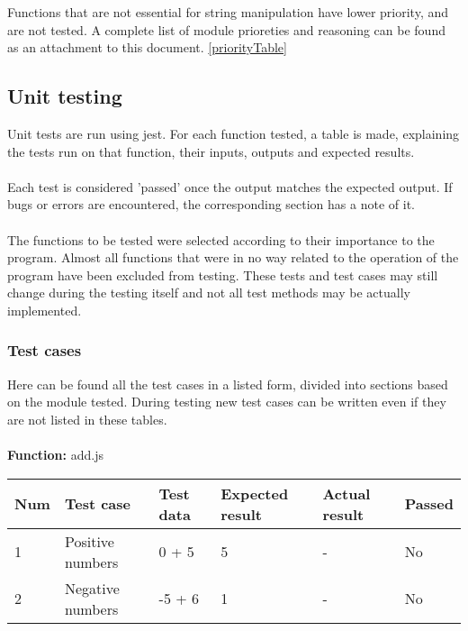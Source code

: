 \documentclass[a4paper, 12pt]{article}
\begin{document}
Functions that are not essential for string manipulation have lower priority, and are not tested.
A complete list of module prioreties and reasoning can be found as an attachment to this document. \ref{priorityTable}


    \subsection{Unit testing}
    Unit tests are run using jest. For each function tested, a table is made, explaining the tests run on that function,
    their inputs, outputs and expected results. 
    \\\\
    Each test is considered 'passed' once the output matches the expected output. 
    If bugs or errors are encountered, the corresponding section has a note of it.
    \\\\
    The functions to be tested were selected according to their importance to the program. Almost all functions that were in no way related to the operation of the program have been excluded from testing. These tests and test cases may still change during the testing itself and not all test methods may be actually implemented. 
    \newpage

        \subsubsection{Test cases}
        Here can be found all the test cases in a listed form, divided into sections based on the module tested. During testing new test cases can be written even if they are not listed in these tables. 
        \\
        \\
        \textbf{Function:} add.js
	
        \begin{table}[h!]
           \begin{tabular}{|l|p{3cm}|p{2cm}|p{2cm}|p{2.5cm}|l|}
                \hline
                Num & Test case        					& Test data 					& Expected result 					& Actual result 		& Passed \\ \hline
                1   & Positive numbers 					& 0 + 5     					& 5               					& -             		& No     \\ \hline
                2   & Negative numbers 					& -5 + 6    					& 1               					& -             		& No     \\ \hline
            \end{tabular}
        \end{table}
    
\end{document}
